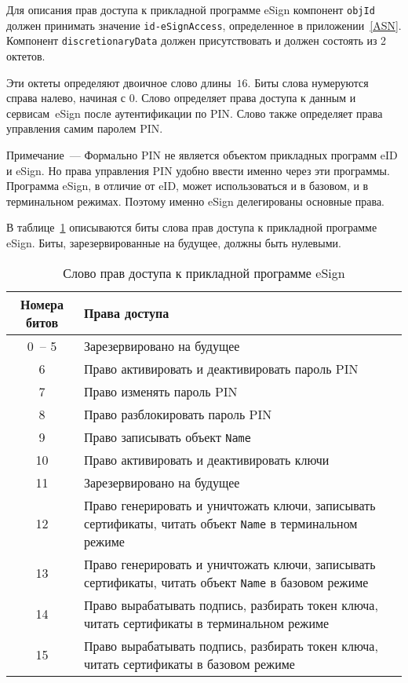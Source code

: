 Для описания прав доступа к прикладной программе eSign компонент \verb|objId| 
должен принимать значение \verb|id-eSignAccess|, определенное в 
приложении~\ref{ASN}. Компонент \verb|discretionaryData| должен 
присутствовать и должен состоять из 2 октетов.


Эти октеты определяют двоичное слово длины~$16$. 
Биты слова нумеруются справа налево, начиная с 0. 
Слово определяет права доступа к данным и сервисам~eSign
после аутентификации по PIN. Слово также определяет права управления самим 
паролем PIN. 

\vskip6pt

\begin{note}
Примечание~--- 
Формально PIN не является объектом прикладных программ eID и eSign. 
%
Но права управления PIN удобно ввести именно через эти программы.
%
Программа eSign, в отличие от eID, может использоваться и в базовом, 
и в терминальном режимах. Поэтому именно eSign делегированы основные права.
\end{note}

\vskip6pt

В таблице~\ref{Table.DATA.SMTAccess} описываются биты слова прав доступа
к прикладной программе eSign. Биты, зарезервированные на будущее, 
должны быть нулевыми.

\begin{table}[h!]
\caption{Слово прав доступа к прикладной программе eSign}
\label{Table.DATA.SMTAccess}
\begin{tabular}{|c|p{13.5cm}|}
\hline
Номера битов & Права доступа\\
\hline
\hline
0~-- 5 &  
Зарезервировано на будущее\\ 
%
\hline 
6 &
Право активировать и деактивировать пароль PIN\\ 
%
\hline 
7 &
Право изменять пароль PIN\\ 
%
\hline 
8 &
Право разблокировать пароль PIN\\ 
%
\hline 
9 &
Право записывать объект \texttt{Name}\\ 
%
\hline 
10 &
Право активировать и деактивировать ключи\\ 
%
\hline 
11 &
Зарезервировано на будущее\\ 
%
\hline 
12 &
Право генерировать и уничтожать ключи, записывать сертификаты, 
читать объект \texttt{Name} в терминальном режиме\\ 
%
\hline 
13 &
Право генерировать и уничтожать ключи, записывать сертификаты, 
читать объект \texttt{Name} в базовом режиме\\ 
%
\hline 
14 &
Право вырабатывать подпись, разбирать токен ключа, читать сертификаты 
в терминальном режиме\\ 
%
\hline 
15 &
Право вырабатывать подпись, разбирать токен ключа, читать сертификаты 
в базовом режиме\\ 
\hline 
\end{tabular}
\end{table}

